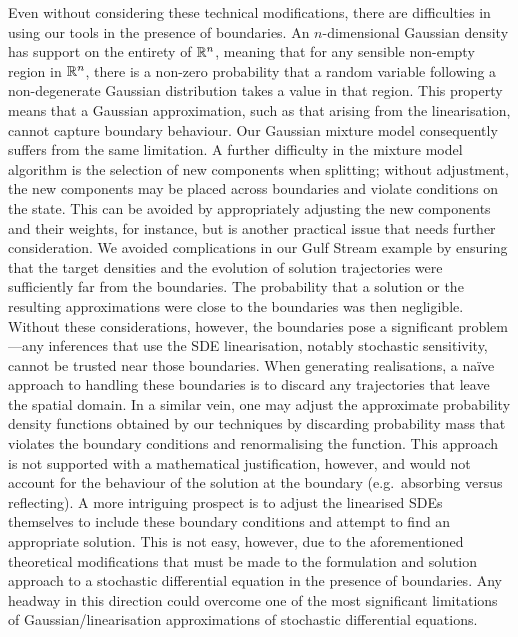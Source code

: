 Even without considering these technical modifications, there are difficulties in using our tools in the presence of boundaries.
An \(n\)-dimensional Gaussian density has support on the entirety of \(\mathbb{R}^n\), meaning that for any sensible non-empty region in \(\mathbb{R}^n\), there is a non-zero probability that a random variable following a non-degenerate Gaussian distribution takes a value in that region.
This property means that a Gaussian approximation, such as that arising from the linearisation, cannot capture boundary behaviour.
Our Gaussian mixture model consequently suffers from the same limitation.
A further difficulty in the mixture model algorithm is the selection of new components when splitting; without adjustment, the new components may be placed across boundaries and violate conditions on the state.
This can be avoided by appropriately adjusting the new components and their weights, for instance, but is another practical issue that needs further consideration.
We avoided complications in our Gulf Stream example by ensuring that the target densities and the evolution of solution trajectories were sufficiently far from the boundaries.
The probability that a solution or the resulting approximations were close to the boundaries was then negligible.
Without these considerations, however, the boundaries pose a significant problem---any inferences that use the SDE linearisation, notably stochastic sensitivity, cannot be trusted near those boundaries.
When generating realisations, a na\"ive approach to handling these boundaries is to discard any trajectories that leave the spatial domain.
In a similar vein, one may adjust the approximate probability density functions obtained by our techniques by discarding probability mass that violates the boundary conditions and renormalising the function.
This approach is not supported with a mathematical justification, however, and would not account for the behaviour of the solution at the boundary (e.g.\ absorbing versus reflecting).
A more intriguing prospect is to adjust the linearised SDEs themselves to include these boundary conditions and attempt to find an appropriate solution.
This is not easy, however, due to the aforementioned theoretical modifications that must be made to the formulation and solution approach to a stochastic differential equation in the presence of boundaries.
Any headway in this direction could overcome one of the most significant limitations of Gaussian/linearisation approximations of stochastic differential equations.



